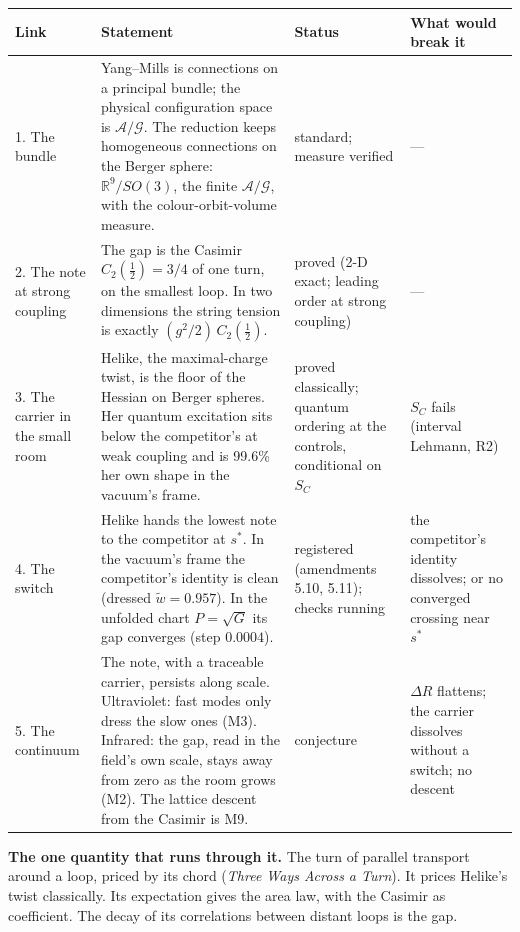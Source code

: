 \documentclass[11pt,letterpaper]{article}
\theoremstyle{plain}
\theoremstyle{definition}
\begin{document}
\begin{center}\small
\begin{tabular}{@{}p{1.15in}p{2.55in}p{1.05in}p{1.45in}@{}}\toprule
\textbf{Link} & \textbf{Statement} & \textbf{Status} & \textbf{What would break it}\\\midrule
1. The bundle & Yang--Mills is connections on a principal bundle; the physical configuration space is $\mathcal A/\mathcal G$. The reduction keeps homogeneous connections on the Berger sphere: $\mathbb R^9/SO(3)$, the finite $\mathcal A/\mathcal G$, with the colour-orbit-volume measure. & standard; measure verified & --- \\[4pt]
2. The note at strong coupling & The gap is the Casimir $C_2(\tfrac12)=3/4$ of one turn, on the smallest loop. In two dimensions the string tension is exactly $(g^2/2)\,C_2(\tfrac12)$. & proved (2-D exact; leading order at strong coupling) & --- \\[4pt]
3. The carrier in the small room & Helike, the maximal-charge twist, is the floor of the Hessian on Berger spheres. Her quantum excitation sits below the competitor's at weak coupling and is 99.6\% her own shape in the vacuum's frame. & proved classically; quantum ordering at the controls, conditional on $S_C$ & $S_C$ fails (interval Lehmann, R2) \\[4pt]
4. The switch & Helike hands the lowest note to the competitor at $s^*$. In the vacuum's frame the competitor's identity is clean (dressed $\tilde w=0.957$). In the unfolded chart $P=\sqrt G$ its gap converges (step $0.0004$). & registered (amendments 5.10, 5.11); checks running & the competitor's identity dissolves; or no converged crossing near $s^*$ \\[4pt]
5. The continuum & The note, with a traceable carrier, persists along scale. Ultraviolet: fast modes only dress the slow ones (M3). Infrared: the gap, read in the field's own scale, stays away from zero as the room grows (M2). The lattice descent from the Casimir is M9. & conjecture & $\Delta R$ flattens; the carrier dissolves without a switch; no descent \\\bottomrule
\end{tabular}
\end{center}

\textbf{The one quantity that runs through it.} The turn of parallel transport
around a loop, priced by its chord (\emph{Three Ways Across a Turn}). It prices
Helike's twist classically. Its expectation gives the area law, with the
Casimir as coefficient. The decay of its correlations between distant loops is
the gap.
\end{document}
